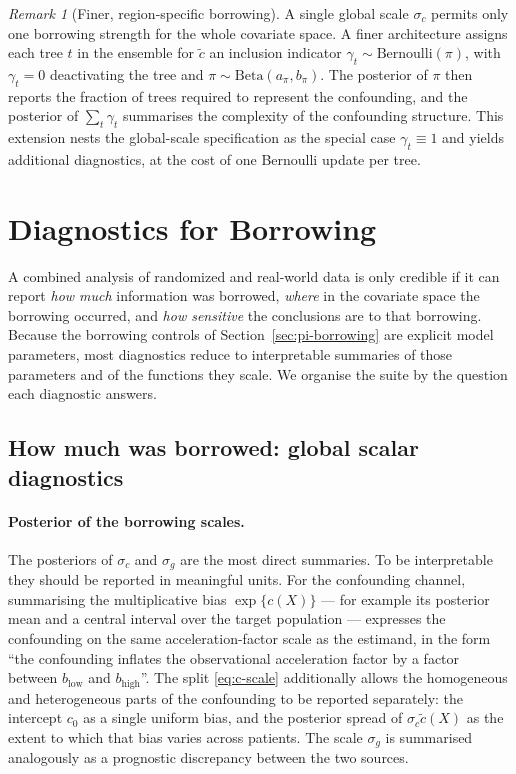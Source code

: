 \documentclass[11pt]{report}
\theoremstyle{plain}
\theoremstyle{definition}
\theoremstyle{remark}
\newcommand{\1}{\mathds{1}}
\theoremstyle{plain}
\theoremstyle{remark}
\newtheorem{remark}[theorem]{Remark}
\begin{document}
\begin{remark}[Finer, region-specific borrowing]
\label{rem:spike-slab}
A single global scale $\sigma_c$ permits only one borrowing strength for the
whole covariate space. A finer architecture assigns each tree $t$ in the
ensemble for $\tilde c$ an inclusion indicator $\gamma_t \sim
\mathrm{Bernoulli}(\pi)$, with $\gamma_t = 0$ deactivating the tree and
$\pi \sim \mathrm{Beta}(a_\pi, b_\pi)$. The posterior of $\pi$ then reports the
fraction of trees required to represent the confounding, and the posterior of
$\sum_t \gamma_t$ summarises the complexity of the confounding structure. This
extension nests the global-scale specification as the special case
$\gamma_t \equiv 1$ and yields additional diagnostics, at the cost of one
Bernoulli update per tree.
\end{remark}

\section{Diagnostics for Borrowing}
\label{sec:pi-diagnostics}

A combined analysis of randomized and real-world data is only credible if it
can report \emph{how much} information was borrowed, \emph{where} in the
covariate space the borrowing occurred, and \emph{how sensitive} the conclusions
are to that borrowing. Because the borrowing controls of
Section~\ref{sec:pi-borrowing} are explicit model parameters, most diagnostics
reduce to interpretable summaries of those parameters and of the functions they
scale. We organise the suite by the question each diagnostic answers.

\subsection{How much was borrowed: global scalar diagnostics}

\paragraph{Posterior of the borrowing scales.}
The posteriors of $\sigma_c$ and $\sigma_g$ are the most direct summaries. To be
interpretable they should be reported in meaningful units. For the confounding
channel, summarising the multiplicative bias $\exp\{c(X)\}$ --- for example its
posterior mean and a central interval over the target population --- expresses
the confounding on the same acceleration-factor scale as the estimand, in the
form ``the confounding inflates the observational acceleration factor by a
factor between $b_{\text{low}}$ and $b_{\text{high}}$''. The split
\eqref{eq:c-scale} additionally allows the homogeneous and heterogeneous parts
of the confounding to be reported separately: the intercept $c_0$ as a single
uniform bias, and the posterior spread of $\sigma_c \tilde c(X)$ as the extent
to which that bias varies across patients. The scale $\sigma_g$ is summarised
analogously as a prognostic discrepancy between the two sources.
\end{document}
